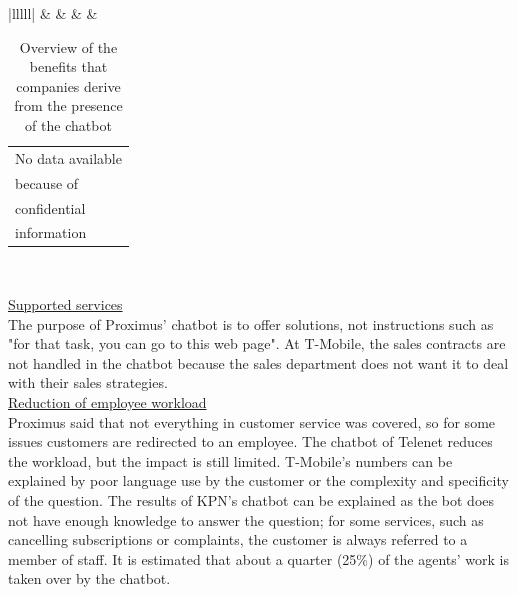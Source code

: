 \begin{table}[htbp!]
{\begin{tabular}{|lllll|}
			 &
			 &
			 &
			 &
			\begin{tabular}[c]{@{}l@{}}No data available\\ because of \\ confidential\\ information\end{tabular} \\ \hline
		\end{tabular}%
	}
	\caption{Overview of the benefits that companies derive from the presence of the chatbot}
	\label{tab:benefits}
\end{table}
\break
\ul{Supported services}\\
The purpose of Proximus' chatbot is to offer solutions, not instructions such as "for that task, you can go to this web page". At T-Mobile, the sales contracts are not handled in the chatbot because the sales department does not want it to deal with their sales strategies.\\
\break
\ul{Reduction of employee workload}\\
Proximus said that not everything in customer service was covered, so for some issues customers are redirected to an employee. The chatbot of Telenet reduces the workload, but the impact is still limited. T-Mobile's numbers can be explained by poor language use by the customer or the complexity and specificity of the question. The results of KPN's chatbot can be explained as the bot does not have enough knowledge to answer the question; for some services, such as cancelling subscriptions or complaints, the customer is always referred to a member of staff. It is estimated that about a quarter (25\%) of the agents' work is taken over by the chatbot.\\
